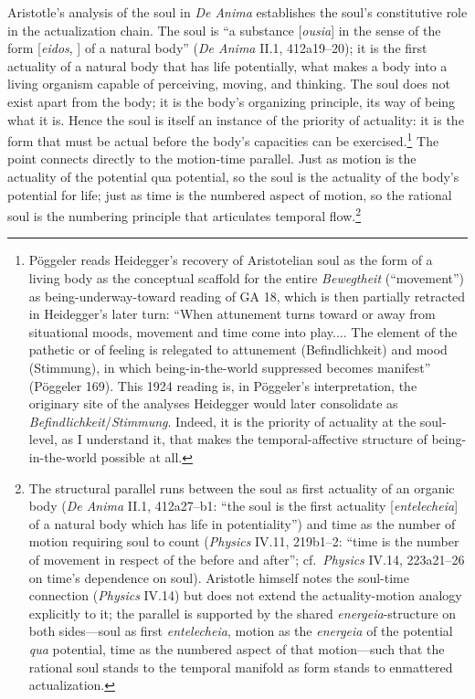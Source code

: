Aristotle's analysis of the soul in \textit{De Anima} establishes the soul's constitutive role in the actualization chain. The soul is ``a substance [\textit{ousia}] in the sense of the form [\textit{eidos}, ] of a natural body'' (\textit{De Anima} II.1, 412a19--20); it is the first actuality of a natural body that has life potentially, what makes a body into a living organism capable of perceiving, moving, and thinking. The soul does not exist apart from the body; it is the body's organizing principle, its way of being what it is. Hence the soul is itself an instance of the priority of actuality: it is the form that must be actual before the body's capacities can be exercised.\footnote{Pöggeler reads Heidegger's recovery of Aristotelian soul as the form of a living body as the conceptual scaffold for the entire \textit{Bewegtheit} (``movement'') as being-underway-toward reading of GA 18, which is then partially retracted in Heidegger's later turn: ``When attunement turns toward or away from situational moods, movement and time come into play.... The element of the pathetic or of feeling is relegated to attunement (Befindlichkeit) and mood (Stimmung), in which being-in-the-world suppressed becomes manifest'' (Pöggeler 169). This 1924 reading is, in Pöggeler's interpretation, the originary site of the analyses Heidegger would later consolidate as \textit{Befindlichkeit}/\textit{Stimmung}. Indeed, it is the priority of actuality at the soul-level, as I understand it, that makes the temporal-affective structure of being-in-the-world possible at all.} The point connects directly to the motion-time parallel. Just as motion is the actuality of the potential qua potential, so the soul is the actuality of the body's potential for life; just as time is the numbered aspect of motion, so the rational soul is the numbering principle that articulates temporal flow.\footnote{The structural parallel runs between the soul as first actuality of an organic body (\textit{De Anima} II.1, 412a27--b1: ``the soul is the first actuality [\textit{entelecheia}] of a natural body which has life in potentiality'') and time as the number of motion requiring soul to count (\textit{Physics} IV.11, 219b1--2: ``time is the number of movement in respect of the before and after''; cf.\ \textit{Physics} IV.14, 223a21--26 on time's dependence on soul). Aristotle himself notes the soul-time connection (\textit{Physics} IV.14) but does not extend the actuality-motion analogy explicitly to it; the parallel is supported by the shared \textit{energeia}-structure on both sides---soul as first \textit{entelecheia}, motion as the \textit{energeia} of the potential \textit{qua} potential, time as the numbered aspect of that motion---such that the rational soul stands to the temporal manifold as form stands to enmattered actualization.}

